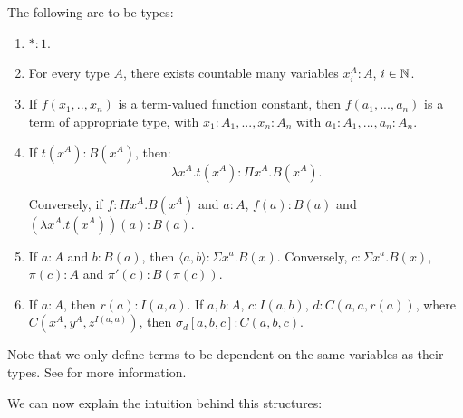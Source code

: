 \begin{definition}\label{1.1.2-seely}
  The following are to be types:
  \begin{enumerate}
  \item $*:1$.
  \item For every type $A$, there exists countable many variables $x_i^A : A$, $i\in \mathbb{N}$.
  \item If $f(x_1,..,x_n)$ is a term-valued function constant, then $f(a_1,...,a_n)$ is a term of appropriate type, with  $x_1:A_1,...,x_n:A_n$ with $a_1:A_1,...,a_n:A_n$.
  \item If $t(x^A) : B(x^A)$, then:
    $$\lambda x^A.t(x^A) : \Pi x^A. B(x^A).$$

    Conversely, if $f : \Pi x^A. B(x^A)$ and $a:A$, $f(a) : B(a)$ and $(\lambda x^A.t(x^A))(a) : B(a)$.
  \item If $a:A$ and $b:B(a)$, then $\langle a, b\rangle : \Sigma x^a. B(x)$. Conversely, $c : \Sigma x^a. B(x)$, $\pi (c) : A$ and $\pi'(c) : B(\pi(c))$. 
  \item If $a:A$, then $r(a): I(a,a)$. If $a,b : A$, $c : I(a,b)$, $d : C(a,a,r(a))$, where $C(x^A,y^A,z^{I(a,a)})$, then $\sigma_d[a,b,c] : C(a,b,c)$.  
  \end{enumerate}
\end{definition}

\begin{remark}
  Note that we only define terms to be dependent on the same variables as their types. See \cite[Section 2.2]{martinlof1973intuitionistic} for more information.
\end{remark}

We can now explain the intuition behind this structures:

